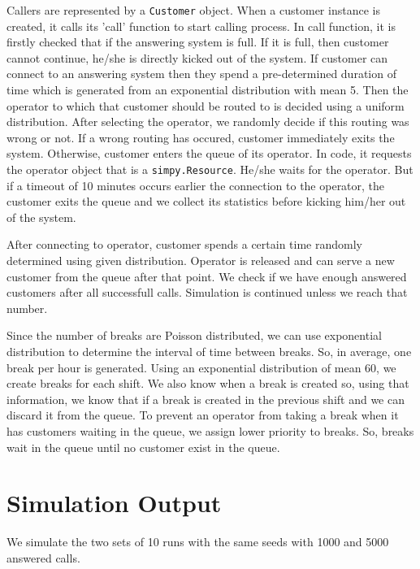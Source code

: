 \documentclass{article}
\begin{document}
Callers are represented by a \texttt{Customer} object. When a customer instance is created, it calls its 'call'
function to start calling process. In call function, it is firstly checked that if the answering system is full. If
it is full, then customer cannot continue, he/she is directly kicked out of the system. If customer can connect to an
answering system then they spend a pre-determined duration of time which is generated from an exponential
distribution with mean 5. Then the operator to which that customer should be routed to is decided using a uniform
distribution. After selecting the operator, we randomly decide if this routing was wrong or not. If a wrong routing
has occured, customer immediately exits the system. Otherwise, customer enters the queue of its
operator. In code, it requests the operator object that is a \texttt{simpy.Resource}. He/she waits for the operator.
But if a timeout of 10 minutes occurs earlier the connection to the operator, the customer exits the queue and we
collect its statistics before kicking him/her out of the system.

After connecting to operator, customer spends a
certain time randomly determined using given distribution. Operator is released and can serve a new customer from the
queue after that point. We check if we have enough answered customers after all successfull calls. Simulation is
continued unless we reach that number.

Since the number of breaks are Poisson distributed, we can use exponential distribution to determine the interval of
time between breaks. So, in average, one break per hour is generated. Using an exponential distribution of mean 60,
we create breaks for each shift. We also know when a break is created so, using that information, we know that if a
break is created in the previous shift and we can discard it from the queue. To prevent an operator from taking a
break when it has customers waiting in the queue, we assign lower priority to breaks. So, breaks wait in the queue
until no customer exist in the queue.

\section{Simulation Output}
We simulate the two sets of 10 runs with the same seeds with 1000 and 5000 answered calls.
\end{document}
